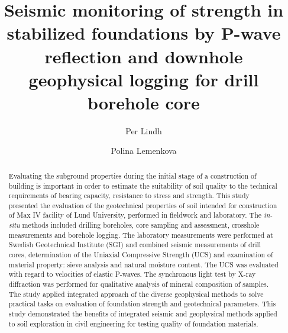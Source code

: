 \documentclass[USenglish,twocolumn]{article}
\begin{document}
 
\author[1]{Per Lindh}
\author*[2]{Polina Lemenkova}

  \title{\huge Seismic monitoring of strength in stabilized foundations by P-wave reflection and downhole geophysical logging for drill borehole core}
  

\begin{abstract}
{Evaluating the subground properties during the initial stage of a construction of building is important in order to estimate the suitability of soil quality to the technical requirements of bearing capacity, resistance to stress and strength. This study presented the evaluation of the geotechnical properties of soil intended for construction of Max IV facility of Lund University, performed in fieldwork and laboratory. The \emph{in-situ} methods included drilling boreholes, core sampling and assessment, crosshole measurements and borehole logging. The laboratory measurements were performed at Swedish Geotechnical Institute (SGI) and combined seismic measurements of drill cores, determination of the Uniaxial Compressive Strength (UCS) and examination of material property: sieve analysis and natural moisture content. The UCS was evaluated with regard to velocities of elastic P-waves. The synchronous light test by X-ray diffraction was performed for qualitative analysis of mineral composition of samples. The study applied integrated approach of the diverse geophysical methods to solve practical tasks on evaluation of foundation strength and geotechnical parameters. This study demonstrated the benefits of integrated seismic and geophysical methods applied to soil exploration in civil engineering for testing quality of foundation materials.}
\end{abstract}
 
\end{document}
